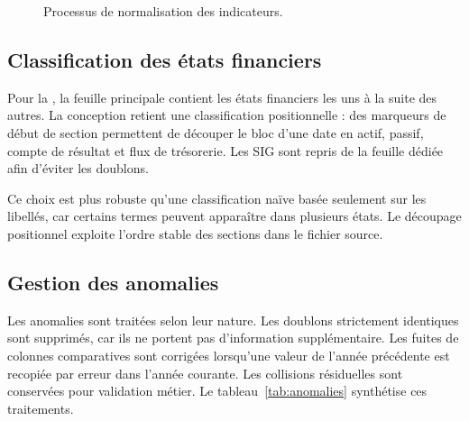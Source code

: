 \begin{figure}[H]
\centering
{}
\caption[Conception de la normalisation]{Processus de normalisation des indicateurs.}
\label{fig:normalisation_ch3}
\end{figure}

\subsection{Classification des états financiers}
\par Pour la \sfbt, la feuille principale contient les états financiers les uns
à la suite des autres. La conception retient une classification positionnelle :
des marqueurs de début de section permettent de découper le bloc d'une date en
actif, passif, compte de résultat et flux de trésorerie. Les SIG sont repris de
la feuille dédiée afin d'éviter les doublons.

\par Ce choix est plus robuste qu'une classification naïve basée seulement sur
les libellés, car certains termes peuvent apparaître dans plusieurs états. Le
découpage positionnel exploite l'ordre stable des sections dans le fichier
source.

\subsection{Gestion des anomalies}
\par Les anomalies sont traitées selon leur nature. Les doublons strictement
identiques sont supprimés, car ils ne portent pas d'information supplémentaire.
Les fuites de colonnes comparatives sont corrigées lorsqu'une valeur de l'année
précédente est recopiée par erreur dans l'année courante. Les collisions
résiduelles sont conservées pour validation métier. Le
tableau~\ref{tab:anomalies} synthétise ces traitements.

